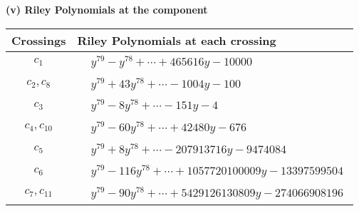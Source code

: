 \documentclass[1p]{elsarticle_modified}
\theoremstyle{definition}
\begin{document}
\newpage\renewcommand{\arraystretch}{1}
\flushleft \textbf{(v) Riley Polynomials at the component}\newline \\
\begin{tabular}{m{50pt}|m{274pt}}
Crossings & \hspace{64pt}Riley Polynomials at each crossing \\
\hline $$\begin{aligned}c_{1}\end{aligned}$$&$\begin{aligned}
&y^{79}- y^{78}+\cdots+465616 y-10000
\end{aligned}$\\
\hline $$\begin{aligned}c_{2},c_{8}\end{aligned}$$&$\begin{aligned}
&y^{79}+43 y^{78}+\cdots-1004 y-100
\end{aligned}$\\
\hline $$\begin{aligned}c_{3}\end{aligned}$$&$\begin{aligned}
&y^{79}-8 y^{78}+\cdots-151 y-4
\end{aligned}$\\
\hline $$\begin{aligned}c_{4},c_{10}\end{aligned}$$&$\begin{aligned}
&y^{79}-60 y^{78}+\cdots+42480 y-676
\end{aligned}$\\
\hline $$\begin{aligned}c_{5}\end{aligned}$$&$\begin{aligned}
&y^{79}+8 y^{78}+\cdots-207913716 y-9474084
\end{aligned}$\\
\hline $$\begin{aligned}c_{6}\end{aligned}$$&$\begin{aligned}
&y^{79}-116 y^{78}+\cdots+1057720100009 y-13397599504
\end{aligned}$\\
\hline $$\begin{aligned}c_{7},c_{11}\end{aligned}$$&$\begin{aligned}
&y^{79}-90 y^{78}+\cdots+5429126130809 y-274066908196
\end{aligned}$\\

\end{tabular}
\end{document}
